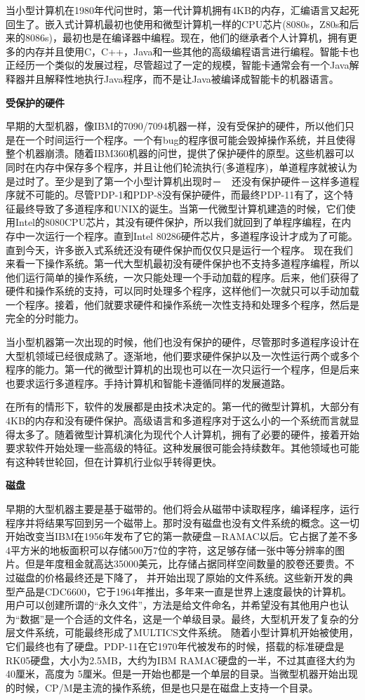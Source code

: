 	当小型计算机在1980年代问世时，第一代计算机拥有4KB的内存，汇编语言又起死回生了。嵌入式计算机最初也使用和微型计算机一样的CPU芯片(8080s，Z80s和后来的8086s)，最初也是在编译器中编程。现在，他们的继承者个人计算机，拥有更多的内存并且使用C，C++，Java和一些其他的高级编程语言进行编程。智能卡也正经历一个类似的发展过程，尽管超过了一定的规模，智能卡通常会有一个Java解释器并且解释性地执行Java程序，而不是让Java被编译成智能卡的机器语言。
	
	\textbf{受保护的硬件}
	
	早期的大型机器，像IBM的7090/7094机器一样，没有受保护的硬件，所以他们只是在一个时间运行一个程序。一个有bug的程序很可能会毁掉操作系统，并且使得整个机器崩溃。随着IBM360机器的问世，提供了保护硬件的原型。这些机器可以同时在内存中保存多个程序，并且让他们轮流执行(多道程序)，单道程序就被认为是过时了。至少是到了第一个小型计算机出现时－　还没有保护硬件－这样多道程序就不可能的。尽管PDP-1和PDP-8没有保护硬件，而最终PDP-11有了，这个特征最终导致了多道程序和UNIX的诞生。当第一代微型计算机建造的时候，它们使用Intel的8080CPU芯片，其没有硬件保护，所以我们就回到了单程序编程，在内存中一次运行一个程序。直到Intel 80286硬件芯片，多道程序设计才成为了可能。直到今天，许多嵌入式系统还没有硬件保护而仅仅只是运行一个程序。
	现在我们来看一下操作系统。第一代大型机最初没有硬件保护也不支持多道程序编程，所以他们运行简单的操作系统，一次只能处理一个手动加载的程序。后来，他们获得了硬件和操作系统的支持，可以同时处理多个程序，这样他们一次就只可以手动加载一个程序。接着，他们就要求硬件和操作系统一次性支持和处理多个程序，然后是完全的分时能力。
	
	当小型机器第一次出现的时候，他们也没有保护的硬件，尽管那时多道程序设计在大型机领域已经很成熟了。逐渐地，他们要求硬件保护以及一次性运行两个或多个程序的能力。第一代的微型计算机的出现也可以在一次只运行一个程序，但是后来也要求运行多道程序。手持计算机和智能卡遵循同样的发展道路。
	
	在所有的情形下，软件的发展都是由技术决定的。第一代的微型计算机，大部分有4KB的内存和没有硬件保护。高级语言和多道程序对于这么小的一个系统而言就显得太多了。随着微型计算机演化为现代个人计算机，拥有了必要的硬件，接着开始要求软件开始处理一些高级的特征。这种发展很可能会持续数年。其他领域也可能有这种转世轮回，但在计算机行业似乎转得更快。
	
	\textbf{磁盘}
	
	早期的大型机器主要是基于磁带的。他们将会从磁带中读取程序，编译程序，运行程序并将结果写回到另一个磁带上。那时没有磁盘也没有文件系统的概念。这一切开始改变当IBM在1956年发布了它的第一款硬盘－RAMAC以后。它占据了差不多4平方米的地板面积可以存储500万7位的字符，这足够存储一张中等分辨率的图片。但是年度租金就高达35000美元，比存储占据同样空间数量的胶卷还要贵。不过磁盘的价格最终还是下降了，
	并开始出现了原始的文件系统。这些新开发的典型产品是CDC6600，它于1964年推出，多年来一直是世界上速度最快的计算机。用户可以创建所谓的“永久文件”，方法是给文件命名，并希望没有其他用户也认为“数据”是一个合适的文件名，这是一个单级目录。最终，大型机开发了复杂的分层文件系统，可能最终形成了MULTICS文件系统。
	随着小型计算机开始被使用，它们最终也有了硬盘。PDP-11在它1970年代被发布的时候，搭载的标准硬盘是RK05硬盘，大小为2.5MB，大约为IBM RAMAC硬盘的一半，不过其直径大约为40厘米，高度为
	5厘米。但是一开始也都是一个单层的目录。当微型机器开始出现的时候，CP/M是主流的操作系统，但是也只是在磁盘上支持一个目录。
	
